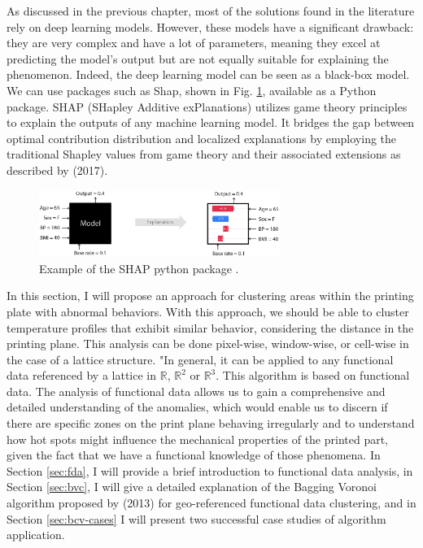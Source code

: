As discussed in the previous chapter, most of the solutions found in the literature rely on deep learning models. However, these models have a significant drawback: they are very complex and have a lot of parameters, meaning they excel at predicting the model's output but are not equally suitable for explaining the phenomenon. Indeed, the deep learning model can be seen as a black-box model. We can use packages such as Shap, shown in Fig. \ref{fig:shap}, available as a Python package. SHAP (SHapley Additive exPlanations) utilizes game theory principles to explain the outputs of any machine learning model. It bridges the gap between optimal contribution distribution and localized explanations by employing the traditional Shapley values from game theory and their associated extensions as described by \citeauthor{lundberg_unified_2017} (2017).
\begin{figure}
    \centering
    \includegraphics[width=0.7\textwidth]{Images/shap.png}
    \caption[SHAP python package.]{Example of the SHAP python package \cite{scott_lundberg_shap_2023}.}
    \label{fig:shap}
\end{figure}
In this section, I will propose an approach for clustering areas within the printing plate with abnormal behaviors. With this approach, we should be able to cluster temperature profiles that exhibit similar behavior, considering the distance in the printing plane. This analysis can be done pixel-wise, window-wise, or cell-wise in the case of a lattice structure. "In general, it can be applied to any functional data referenced by a lattice in $\mathbb{R}$, $\mathbb{R}^2$ or $\mathbb{R}^3$. This algorithm is based on functional data. The analysis of functional data allows us to gain a comprehensive and detailed understanding of the anomalies, which would enable us to discern if there are specific zones on the print plane behaving irregularly and to understand how hot spots might influence the mechanical properties of the printed part, given the fact that we have a functional knowledge of those phenomena. In Section \ref{sec:fda}, I will provide a brief introduction to functional data analysis, in Section \ref{sec:bvc}, I will give a detailed explanation of the Bagging Voronoi algorithm proposed by \citeauthor{secchi_bagging_2013} (2013) for geo-referenced functional data clustering, and in Section \ref{sec:bcv-cases} I will present two successful case studies of algorithm application.

